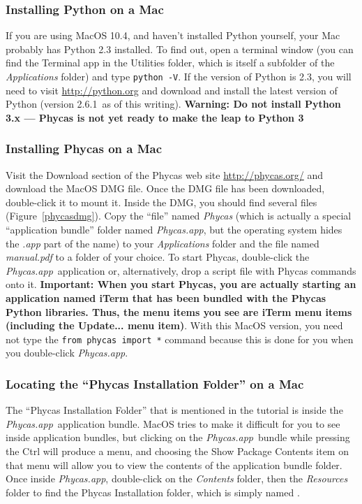\documentclass[10pt]{article}
\newcommand{\currPyVersion}{2.6.1}
\newcommand{\pathname}[1]{{\em #1}}				%
\newcommand{\menu}[1]{{\sf #1}}					%
\newcommand{\keycmd}[1]{{\sf #1}}					%
\newcommand{\code}[1]{{\tt #1}}					%
\newcommand{\important}[1]{{\bf Important: #1}}	%
\newcommand{\warning}[1]{{\bf Warning: #1}}		%
\newcommand{\warnNoPyThree}{\warning{Do not install Python 3.x --- Phycas is not yet ready to make the leap to Python 3}}
\newcommand{\phycasapp}{\pathname{Phycas.app}}
\begin{document}
\subsubsection{Installing Python on a Mac}

If you are using MacOS 10.4, and haven't installed Python yourself, your Mac probably has Python 2.3 installed. To find out, open a terminal window (you can find the Terminal app in the Utilities folder, which is itself a subfolder of the \pathname{Applications} folder) and type \code{python -V}. If the version of Python is 2.3, you will need to visit \url{http://python.org} and download and install the latest version of Python (version \currPyVersion\ as of this writing). \warnNoPyThree

\subsubsection{Installing Phycas on a Mac}

Visit the Download section of the Phycas web site \url{http://phycas.org/} and download the MacOS DMG file. Once the DMG file has been downloaded, double-click it to mount it. Inside the DMG, you should find several files (Figure~\ref{phycasdmg}). Copy the ``file'' named \pathname{Phycas} (which is actually a special ``application bundle'' folder named \phycasapp, but the operating system hides the \pathname{.app} part of the name) to your \pathname{Applications} folder and the file named \pathname{manual.pdf} to a folder of your choice. To start Phycas, double-click the \phycasapp\ application or, alternatively, drop a script file with Phycas commands onto it. \important{When you start Phycas, you are actually starting an application named iTerm that has been bundled with the Phycas Python libraries. Thus, the menu items you see are iTerm menu items (including the \menu{Update...} menu item)}. With this MacOS version, you need not type the \code{from phycas import *} command because this is done for you when you double-click \phycasapp.

\subsubsection{Locating the ``Phycas Installation Folder'' on a Mac} \label{subsubsec:installfoldermac}

The ``Phycas Installation Folder'' that is mentioned in the tutorial is inside the \phycasapp\ application bundle. MacOS tries to make it difficult for you to see inside application bundles, but clicking on the \phycasapp\ bundle while pressing the \keycmd{Ctrl} will produce a menu, and choosing the \menu{Show Package Contents} item on that menu will allow you to view the contents of the application bundle folder. Once inside \phycasapp, double-click on the \pathname{Contents} folder, then the \pathname{Resources} folder to find the Phycas Installation folder, which is simply named .
\end{document}
